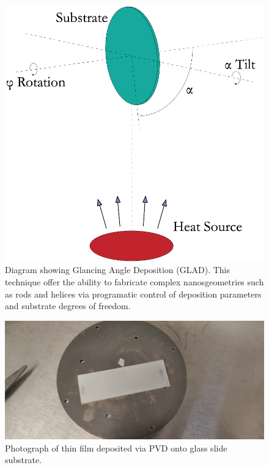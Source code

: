 \begin{figure}[t]
  \centering
  \includegraphics[width=\textwidth]{figs/4-Raman/GLAD.png}
  \caption{Diagram showing Glancing Angle Deposition (\acs{GLAD}). This technique offer the ability to fabricate complex nanosgeometries such as rods and helices via programatic control of deposition parameters and substrate degrees of freedom.}
  \label{fig:Raman:GLAD}
\end{figure}

\begin{figure}[t]
  \centering
  \includegraphics[width=\textwidth]{figs/4-Raman/slide-with-TeO2-film-on-substrate.jpeg}
  \caption{Photograph of  thin film deposited via \ac{PVD} onto glass slide substrate.}%
  \label{fig:Raman:TeO2onSubstrate}
\end{figure}

